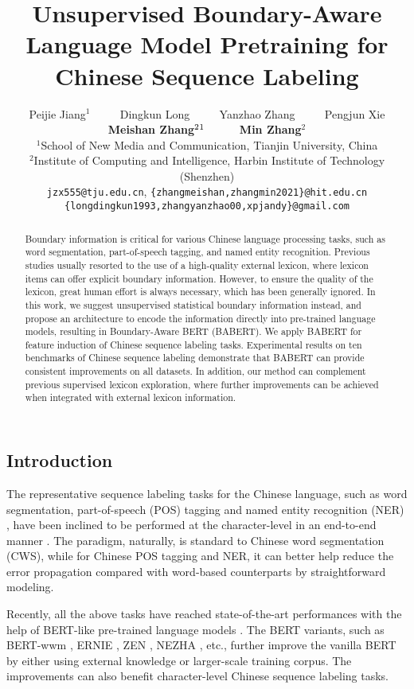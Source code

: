 \documentclass[11pt]{article}
\title{Unsupervised Boundary-Aware Language Model Pretraining for Chinese Sequence Labeling}
\author{
  Peijie Jiang$^1$ ~~~~ Dingkun Long ~~~~ Yanzhao Zhang ~~~~ Pengjun Xie \\
  {\bf Meishan Zhang$^2\thanks{~~Corresponding author.}$ ~~~~ Min Zhang$^2$} \\
  $^1$School of New Media and Communication, Tianjin University, China\\
  $^2$Institute of Computing and Intelligence, Harbin Institute of Technology (Shenzhen)\\
  \texttt{jzx555@tju.edu.cn}, \texttt{\{zhangmeishan,zhangmin2021\}@hit.edu.cn}\\
  \texttt{\{longdingkun1993,zhangyanzhao00,xpjandy\}@gmail.com}\\
}
\begin{document}
\begin{CJK}{UTF8}{gbsn}

\maketitle
\begin{abstract}
  Boundary information is critical for various Chinese language processing tasks, such as word segmentation, part-of-speech tagging, and named entity recognition.
  Previous studies usually resorted to the use of a high-quality external lexicon, where lexicon items can offer explicit boundary information. 
  However, to ensure the quality of the lexicon, great human effort is always necessary, which has been generally ignored.  
  In this work, we suggest unsupervised statistical boundary information instead,   
  and propose an architecture to encode the information directly into pre-trained language models,
  resulting in Boundary-Aware BERT (BABERT).
  We apply BABERT for feature induction of Chinese sequence labeling tasks. 
  Experimental results on ten benchmarks of Chinese sequence labeling demonstrate that BABERT can provide consistent improvements on all datasets.
  In addition,
  our method can complement previous supervised lexicon exploration,
  where further improvements can be achieved when integrated with external lexicon information.


\end{abstract}

\section{Introduction}
The representative sequence labeling tasks for the Chinese language, such as word segmentation,
part-of-speech (POS) tagging and named entity recognition (NER) \cite{emerson-2005-second, jin-chen-2008-fourth},
have been inclined to be performed at the character-level in an end-to-end manner \cite{shen-etal-2016-consistent}.
The paradigm, naturally, is standard to Chinese word segmentation (CWS),
while for Chinese POS tagging and NER,
it can better help reduce the error propagation \cite{sun-uszkoreit-2012-capturing, Yang2016Combining, liu-etal-2019-encoding}
compared with word-based counterparts by straightforward modeling.





Recently, all the above tasks have reached state-of-the-art performances with the help of BERT-like pre-trained language models \cite{yan2019tener, meng2019glyce}.
The BERT variants, such as BERT-wwm \cite{cui2021pre}, ERNIE \cite{sun2019ernie}, ZEN \cite{diao-etal-2020-zen}, NEZHA \cite{wei2019nezha}, etc.,
further improve the vanilla BERT by either using external knowledge or larger-scale training corpus.
The improvements can also benefit character-level Chinese sequence labeling tasks.




\end{CJK}
\end{document}
